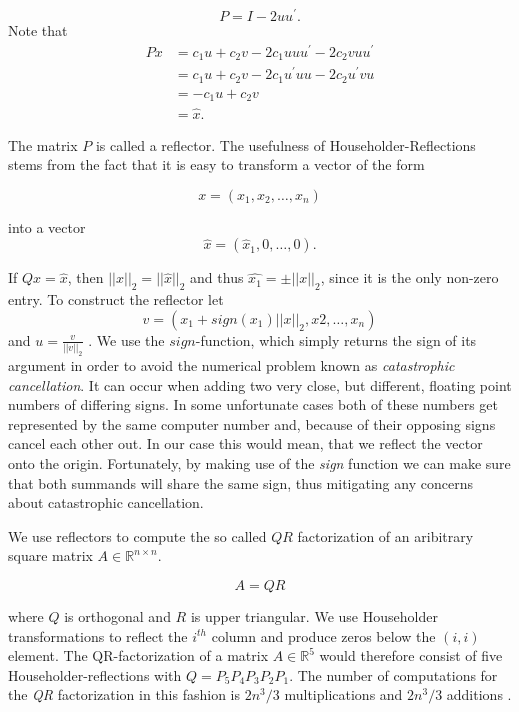 \documentclass[12pt]{article}
\begin{document}
\begin{equation}
P = I - 2 uu^{\prime}.
\end{equation}
Note that
\begin{align*}
Px &= c_1 u + c_2 v - 2c_1 uuu^{\prime} - 2 c_2 v uu^{\prime} \\
   &= c_1 u + c_2 v - 2c_1 u^{\prime}uu - 2 c_2 u^{\prime} v u \\
   &= -c_1 u + c_2 v\\
   &= \hat{x}.
\end{align*}

The matrix $P$ is called a reflector. The usefulness of Householder-Reflections stems from the fact that it is easy to transform a vector of the form

$$x = (x_1, x_2, \dots, x_n)$$

into a vector
$$\hat{x} = (\hat{x}_1, 0, \dots, 0).$$

If $Qx = \hat{x}$, then $||x||_2 = ||\hat{x}||_2$ and thus $\hat{x_1} = \pm ||x||_2$, since it is the only non-zero entry. To construct the reflector let
\begin{equation}
\label{house-con}
v = (x_1 + sign(x_1)||x||_2, x2, \dots, x_n)
\end{equation}
and $u = \frac{v}{||v||_2}$ \cite{NLA}. We use the $sign$-function, which simply returns the sign of its argument in order to avoid the numerical problem known as \textit{catastrophic cancellation}. It can occur when adding two very close, but different, floating point numbers of differing signs. In some unfortunate cases both of these numbers get represented by the same computer number and, because of their opposing signs cancel each other out. In our case this would mean, that we reflect the vector onto the origin. Fortunately, by making use of the \textit{sign} function we can make sure that both summands will share the same sign, thus mitigating any concerns about catastrophic cancellation.

We use reflectors to compute the so called $QR$ factorization of an aribitrary square matrix $A \in \mathbb{R}^{n \times n}$.

\begin{equation}
\label{QR-prop}
A = QR
\end{equation}

where $Q$ is orthogonal and $R$ is upper triangular. We use Householder transformations to reflect the $i^{th}$ column and produce zeros below the $(i, i)$ element. The QR-factorization of a matrix $A \in \mathbb{R}^5$ would therefore consist of five Householder-reflections with $Q=P_5 P_4 P_3 P_2 P_1$. The number of computations for the \textit{QR} factorization in this fashion is $2n^3 / 3$ multiplications and $2n^3 / 3$ additions \cite{NLA}.  
\end{document}

